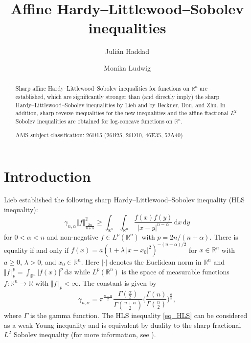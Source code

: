 \documentclass{amsart}
\title[Affine Hardy--Littlewood--Sobolev inequalities]{Affine Hardy--Littlewood--Sobolev inequalities}
\author{Juli\'an Haddad}
\author{Monika Ludwig}
\newcommand{\R}{\mathbb R}
\renewcommand{\d}{\,\mathrm{d}}
\begin{document}
\begin{abstract}
Sharp affine Hardy--Littlewood--Sobolev inequalities for functions on $\R^n$ are
established, which are significantly stronger than (and directly imply) the sharp Hardy--Littlewood--Sobolev inequalities by Lieb and by Beckner, Dou, and Zhu. In addition, sharp reverse inequalities for the new inequalities and the affine fractional $L^2$ Sobolev inequalities are obtained for log-concave functions on $\R^n$.

\bigskip
{ AMS subject classification:  26D15 (26B25, 26D10, 46E35, 52A40)}
\end{abstract}

\maketitle

\section{Introduction}
Lieb \cite{Lieb83} established the following sharp Hardy--Littlewood--Sobolev inequality  (HLS inequality): 
\begin{equation}\label{eq_HLS}
\gamma_{n,\alpha}\Vert f\Vert_{\frac{2n}{n+\alpha}}^2\ge 
\int_{\R^n}\int_{\R^n} \frac{f(x) f(y)}{\vert x-y\vert^{n-\alpha}} \d x\d y
\end{equation}
for $0<\alpha<n$ and non-negative $f\in L^p(\R^n)$  with $p = {2n}/({n+\alpha})$.
There is equality if and only if $f(x) = a (1 + \lambda\,|x-x_0|^2)^{-(n+\alpha)/2}$  for $x\in\R^n$ with $a\ge 0$, $\lambda>0$, and $x_0\in\R^n$.
Here $\vert \cdot\vert$ denotes  the Euclidean norm in $\R^n$ and $\Vert f\Vert_{p}^p =\int_{\R^n} \vert f(x)\vert^p\d x$ while $L^p(\R^n)$ is the space of measurable functions $f:\R^n\to\R$ with $\Vert f\Vert_{p}<\infty$. 
The constant is given by
\begin{equation}\label{eq_HLS_const}
    \gamma_{n,\alpha}= \pi^{\frac{n-\alpha}2}\frac{\Gamma(\frac{\alpha}2)}{\Gamma(\frac{n+\alpha}2)}\Big(\frac{\Gamma(n)}{\Gamma(\frac n2)}\Big)^{\frac \alpha n},
\end{equation}
where $\Gamma$ is the gamma function. The HLS inequality \eqref{eq_HLS} can be considered as a weak Young inequality and is equivalent by duality to the sharp fractional $L^2$ Sobolev inequality (for more information, see \cite{Lieb:Loss, CarlenLoss, Carlen2017, FrankLieb2010}).
\end{document}
